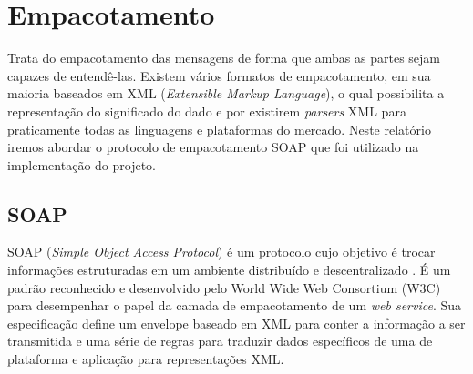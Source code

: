\section{Empacotamento}

Trata do empacotamento das mensagens de forma que ambas as partes sejam capazes de entendê-las. Existem vários formatos de empacotamento, em sua maioria baseados em XML (\textit{Extensible Markup Language}), o qual possibilita a representação do significado do dado e por existirem \textit{parsers} XML para praticamente todas as linguagens e plataformas do mercado. Neste relatório iremos abordar o protocolo de empacotamento SOAP que foi utilizado na implementação do projeto.

\subsection{SOAP}

SOAP (\textit{Simple Object Access Protocol}) é um protocolo cujo objetivo é trocar informações estruturadas em um ambiente distribuído e descentralizado \cite{ref-soap-rfc}. É um padrão reconhecido e desenvolvido pelo World Wide Web Consortium (W3C) para desempenhar o papel da camada de empacotamento de um \textit{web service}. Sua especificação define um envelope baseado em XML para conter a informação a ser transmitida e uma série de regras para traduzir dados específicos de uma de plataforma e aplicação para representações XML.

